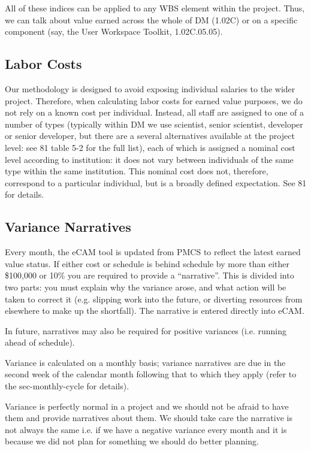 All of these indices can be applied to any WBS element within the
project. Thus, we can talk about value earned across the whole of DM
(1.02C) or on a specific component (say, the User Workspace Toolkit,
1.02C.05.05).

\subsection{Labor Costs}\label{labor-costs}

Our methodology is designed to avoid exposing individual salaries to the
wider project. Therefore, when calculating labor costs for earned value
purposes, we do not rely on a known cost per individual. Instead, all
staff are assigned to one of a number of types (typically within DM we
use scientist, senior scientist, developer or senior developer, but
there are a several alternatives available at the project level: see 81
table 5-2 for the full list), each of which is assigned a nominal cost
level according to institution: it does not vary between individuals of
the same type within the same institution. This nominal cost does not,
therefore, correspond to a particular individual, but is a broadly
defined expectation. See 81 for details.

\subsection{Variance Narratives}\label{variance-narratives}

Every month, the eCAM tool is updated from PMCS to reflect the latest
earned value status. If either cost or schedule is behind schedule by
more than either \$100,000 or 10\% you are required to provide a
``narrative''. This is divided into two parts: you must explain why the
variance arose, and what action will be taken to correct it (e.g.
slipping work into the future, or diverting resources from elsewhere to
make up the shortfall). The narrative is entered directly into eCAM.

In future, narratives may also be required for positive variances (i.e.
running ahead of schedule).

Variance is calculated on a monthly basis; variance narratives are due
in the second week of the calendar month following that to which they
apply (refer to the sec-monthly-cycle for details).

Variance is perfectly normal in a project and we should not be afraid to
have them and provide narratives about them. We should take care the
narrative is not always the same i.e. if we have a negative variance
every month and it is because we did not plan for something we should do
better planning.

